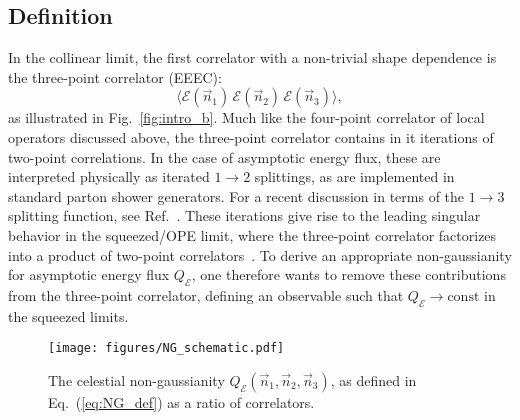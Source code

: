 \documentclass[letterpaper,11pt]{article}
\def\Fig#1{Fig.~{\ref{#1}}}
\def\to{\rightarrow}
\DeclareRobustCommand{\Fig}[1]{Fig.~\ref{#1}}
\DeclareRobustCommand{\Eq}[1]{Eq.~(\ref{#1})}
\DeclareRobustCommand{\Ref}[1]{Ref.~\cite{#1}}
\def\cE{\mathcal{E}}
\def\cE{\mathcal{E}}
\begin{document}
\subsection{Definition}\label{sec:def}

In the collinear limit, the first correlator with a non-trivial shape dependence is the three-point correlator (EEEC):
%
\begin{equation}
\langle\mathcal{E}(\vec{n}_1)\, \mathcal{E}(\vec{n}_2)\, \mathcal{E}(\vec{n}_3)\rangle,
\end{equation}
%
as illustrated in \Fig{fig:intro_b}.
%
Much like the four-point correlator of local operators discussed above, the three-point correlator contains in it iterations of two-point correlations.
%
In the case of asymptotic energy flux, these are interpreted physically as iterated $1\to 2$ splittings, as are implemented in standard parton shower generators.
%
For a recent discussion in terms of the $1\to 3$ splitting function, see \Ref{Braun-White:2022rtg}.
%
These iterations give rise to the leading singular behavior in the squeezed/OPE limit, where the three-point correlator factorizes into a product of two-point correlators~\cite{Chen:2021gdk,Chen:2020adz}.
%
To derive an appropriate non-gaussianity for asymptotic energy flux $Q_\cE$, one therefore wants to remove these contributions from the three-point correlator, defining an observable such that  $Q_\cE\to \text{const}$ in the squeezed limits. 



\begin{figure}[t]
\begin{center}
\texttt{[image: figures/NG\_schematic.pdf]}
\end{center}
\caption{The celestial non-gaussianity $Q_{\mathcal{E}}(\vec n_1, \vec n_2, \vec n_3)$, as defined in \Eq{eq:NG_def} as a ratio of correlators. }
\label{fig:NG_def}
\end{figure}
\end{document}

